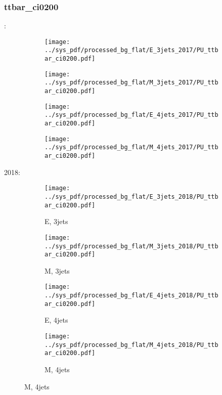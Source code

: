 \documentclass{beamer}
\begin{document}
\begin{frame}
\frametitle{ttbar_ci0200}
\fontsize{5}{1}:
\begin{figure}
\centering
\begin{subfigure}[b]{0.24\textwidth}
\texttt{[image: ../sys\_pdf/processed\_bg\_flat/E\_3jets\_2017/PU\_ttbar\_ci0200.pdf]}
\end{subfigure}
\begin{subfigure}[b]{0.24\textwidth}
\texttt{[image: ../sys\_pdf/processed\_bg\_flat/M\_3jets\_2017/PU\_ttbar\_ci0200.pdf]}
\end{subfigure}
\begin{subfigure}[b]{0.24\textwidth}
\texttt{[image: ../sys\_pdf/processed\_bg\_flat/E\_4jets\_2017/PU\_ttbar\_ci0200.pdf]}
\end{subfigure}
\begin{subfigure}[b]{0.24\textwidth}
\texttt{[image: ../sys\_pdf/processed\_bg\_flat/M\_4jets\_2017/PU\_ttbar\_ci0200.pdf]}
\end{subfigure}
\end{figure}
2018:
\begin{figure}
\centering
\begin{subfigure}[b]{0.24\textwidth}
\texttt{[image: ../sys\_pdf/processed\_bg\_flat/E\_3jets\_2018/PU\_ttbar\_ci0200.pdf]}
\captionsetup{font=tiny}
\caption{E, 3jets}
\end{subfigure}
\begin{subfigure}[b]{0.24\textwidth}
\texttt{[image: ../sys\_pdf/processed\_bg\_flat/M\_3jets\_2018/PU\_ttbar\_ci0200.pdf]}
\captionsetup{font=tiny}
\caption{M, 3jets}
\end{subfigure}
\begin{subfigure}[b]{0.24\textwidth}
\texttt{[image: ../sys\_pdf/processed\_bg\_flat/E\_4jets\_2018/PU\_ttbar\_ci0200.pdf]}
\captionsetup{font=tiny}
\caption{E, 4jets}
\end{subfigure}
\begin{subfigure}[b]{0.24\textwidth}
\texttt{[image: ../sys\_pdf/processed\_bg\_flat/M\_4jets\_2018/PU\_ttbar\_ci0200.pdf]}
\captionsetup{font=tiny}
\caption{M, 4jets}
\end{subfigure}
\end{figure}
\end{frame}
\end{document}
